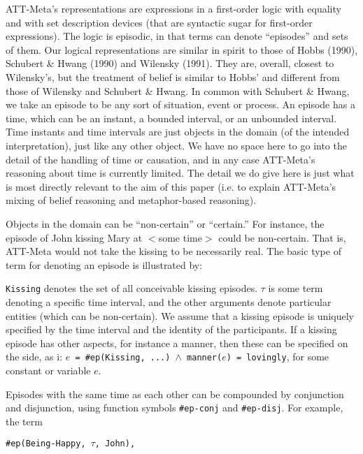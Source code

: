 ATT-Meta's representations are expressions in a first-order logic with equality
and with set description devices (that are syntactic sugar for first-order
expressions). The logic is episodic, in that terms can denote ``episodes'' and
sets of them.  Our logical representations are similar in spirit to those of
Hobbs (1990), Schubert \& Hwang (1990) and Wilensky (1991). They are,
overall, closest to Wilensky's, but the treatment of belief is similar to Hobbs'
and different from those of Wilensky and Schubert \& Hwang.  In common with
Schubert \& Hwang, we take an episode to be any sort of situation, event or
process. An episode has a time, which can be an instant, a bounded interval,
or an unbounded interval.  Time instants and time intervals are just objects
in the domain (of the intended interpretation), just like any other object. We
have no space here to go into the detail of the handling of time or causation,
and in any case ATT-Meta's reasoning about time is currently limited.
The detail we do give here is just what is most directly relevant to the aim of
this paper (i.e. to explain ATT-Meta's mixing of belief reasoning and
metaphor-based reasoning).

Objects in the domain can be ``non-certain'' or ``certain.'' For instance, the
episode of John kissing Mary at $<$some time$>$ could be non-certain. That is,
ATT-Meta would not take the kissing to be necessarily real.  The basic type of
term for denoting an episode is illustrated by:


\noindent
{\tt Kissing} denotes the set of all conceivable kissing episodes.  $\tau$ is
some term denoting a specific time interval, and the other arguments denote
particular entities (which can be non-certain).  We assume that a kissing
episode is uniquely specified by the time interval and the identity of the
participants.  If a kissing episode has other aspects, for instance a manner,
then these can be specified on the side, as i: {\tt $e$ = \#ep(Kissing,
...) $\land$ manner($e$) = lovingly}, for some constant or variable $e$. 

Episodes with the same time as each other can be compounded by conjunction and
disjunction, using function symbols {\tt \#ep-conj} and {\tt \#ep-disj}. 
For example, the  term 

\begin{tabbing}
\={\tt \#ep(Being-Happy, $\tau$, John),}\\
\end{tabbing}

